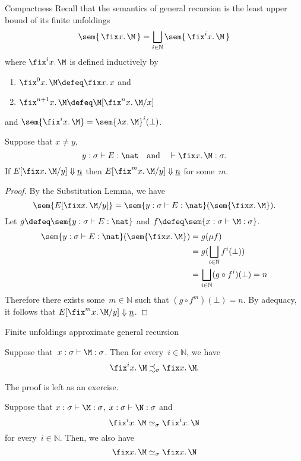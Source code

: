 \begin{frame}{Compactness}
  Recall that the semantics of general recursion is the least upper bound of
  its finite unfoldings 
  \[
    \sem{\,\fix x.\, \M\,}
    = \bigsqcup_{i \in \mathbb{N}} \sem{\,\fix^i x.\, \M\,}
  \]
  where $\fix^i x.\, \M$ is defined inductively by
  \begin{enumerate}
    \item $\fix^0 x.\, \M \defeq \fix x.\, x$ and
    \item $\fix^{n+1} x.\, \M \defeq \M[\fix^{n} x.\, \M /x]$
  \end{enumerate}
  and $\sem{\fix^i x.\,\M} = \sem{\lambda x.\, \M}^i(\bot)$.
  \begin{theorem}
    Suppose that $x \neq y$, 
    \[
      y : \sigma \vdash E : \nat
      \quad\text{and}\quad
      \vdash \fix x.\, \M : \sigma.
    \]
    If $E[ \fix x.\, \M / y] \Downarrow \underline{n}$ then
    $E[ \fix^m x.\, \M / y] \Downarrow \underline{n}$ for some~$m$.
  \end{theorem}
\end{frame}

\begin{frame}
  \begin{proof}
    By the Substitution Lemma, we have
    \[
      \sem{E[\fix x.\, \M / y]} = \sem{y : \sigma \vdash E : \nat}(\sem{\fix
        x.\, \M}).
    \]
    Let $g \defeq \sem{y : \sigma \vdash E : \nat}$
    and $f \defeq \sem{x : \sigma \vdash \M : \sigma}$. 
    \begin{align*}
      \sem{y : \sigma \vdash E : \nat}(\sem{\fix x.\,\M}) & = g(\mu f) \\
      & = g(\bigsqcup_{i \in \mathbb{N}} f^i (\bot)) \\ 
      & = \bigsqcup_{i \in \mathbb{N}} (g \circ f^i)(\bot) = n
    \end{align*}
    Therefore there exists some~$m \in \mathbb{N}$ such that $(g \circ
    f^m)(\bot) = n$. By adequacy, it follows that $E[\fix^m x.\, \M/ y]
    \Downarrow \underline{n}$.
  \end{proof}
\end{frame}

\begin{frame}{Finite unfoldings approximate general recursion} 
  \begin{lemma}
    Suppose that~$x : \sigma \vdash \M : \sigma$. Then for every~$i \in
    \mathbb{N}$, we have
    \[
      \fix^i x.\,\M \precsim_\sigma \fix x.\,\M. 
    \]
  \end{lemma}
  The proof is left as an exercise. 
  \begin{theorem}
    Suppose that $x : \sigma \vdash \M : \sigma$, $x : \sigma \vdash \N
    :\sigma$ and 
    \[
      \fix^i x.\,\M \simeq_\sigma \fix^i x.\,\N
    \]
    for every~$i \in \mathbb{N}$.
    Then, we also have
    \[
      \fix x.\,\M
      \mathrel{\simeq_\sigma}
      \fix x.\, \N
    \]
  \end{theorem}
\end{frame}

